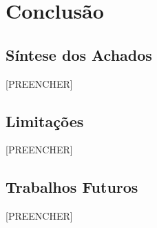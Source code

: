\chapter{Conclusão}
\label{cap:conclusao}

\section{Síntese dos Achados}
[PREENCHER]

\section{Limitações}
[PREENCHER]

\section{Trabalhos Futuros}
[PREENCHER]

